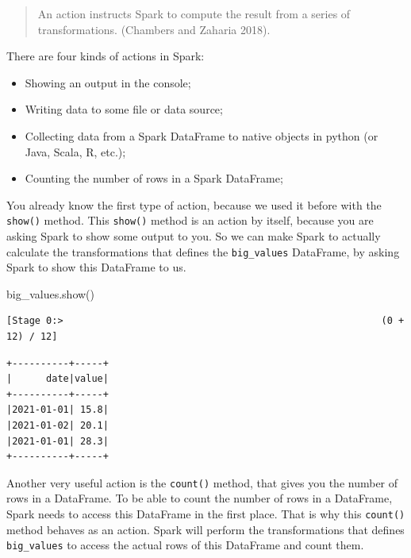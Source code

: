 \documentclass[
  11pt,
  letterpaper,
  DIV=11,
  numbers=noendperiod]{scrreprt}
\newenvironment{Shaded}{\begin{snugshade}}{\end{snugshade}}
\newcommand{\NormalTok}[1]{\textcolor[rgb]{0.00,0.23,0.31}{#1}}
\providecommand{\tightlist}{%
  \setlength{\itemsep}{0pt}\setlength{\parskip}{0pt}}\usepackage{longtable,booktabs,array}
\begin{document}
\begin{quote}
An action instructs Spark to compute the result from a series of
transformations. (Chambers and Zaharia 2018).
\end{quote}

There are four kinds of actions in Spark:

\begin{itemize}
\tightlist
\item
  Showing an output in the console;
\item
  Writing data to some file or data source;
\item
  Collecting data from a Spark DataFrame to native objects in python (or
  Java, Scala, R, etc.);
\item
  Counting the number of rows in a Spark DataFrame;
\end{itemize}

You already know the first type of action, because we used it before
with the \texttt{show()} method. This \texttt{show()} method is an
action by itself, because you are asking Spark to show some output to
you. So we can make Spark to actually calculate the transformations that
defines the \texttt{big\_values} DataFrame, by asking Spark to show this
DataFrame to us.

\begin{Shaded}
\begin{Highlighting}[]
\NormalTok{big\_values.show()}
\end{Highlighting}
\end{Shaded}

\begin{verbatim}
[Stage 0:>                                                        (0 + 12) / 12]
\end{verbatim}

\begin{verbatim}
+----------+-----+
|      date|value|
+----------+-----+
|2021-01-01| 15.8|
|2021-01-02| 20.1|
|2021-01-01| 28.3|
+----------+-----+
\end{verbatim}

Another very useful action is the \texttt{count()} method, that gives
you the number of rows in a DataFrame. To be able to count the number of
rows in a DataFrame, Spark needs to access this DataFrame in the first
place. That is why this \texttt{count()} method behaves as an action.
Spark will perform the transformations that defines \texttt{big\_values}
to access the actual rows of this DataFrame and count them.
\end{document}
